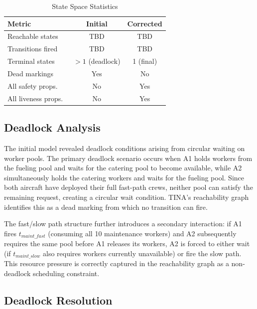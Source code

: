 \documentclass[conference]{IEEEtran}
\begin{document}
\begin{table}[htbp]
  \caption{State Space Statistics}
  \label{tab:statespace}
  \small
  \begin{tabularx}{\columnwidth}{@{}Xcc@{}}
    \toprule
    \textbf{Metric} & \textbf{Initial} & \textbf{Corrected} \\
    \midrule
    Reachable states     & TBD            & TBD           \\
    Transitions fired    & TBD            & TBD           \\
    Terminal states      & $>1$ (deadlock) & 1 (final)    \\
    Dead markings        & Yes            & No            \\
    All safety props.\   & No             & Yes           \\
    All liveness props.\ & No             & Yes           \\
    \bottomrule
  \end{tabularx}
\end{table}

\subsection{Deadlock Analysis}

The initial model revealed deadlock conditions arising from circular waiting on
worker pools. The primary deadlock scenario occurs when A1 holds workers from the
fueling pool and waits for the catering pool to become available, while A2
simultaneously holds the catering workers and waits for the fueling pool. Since
both aircraft have deployed their full fast-path crews, neither pool can satisfy
the remaining request, creating a circular wait condition. TINA's reachability
graph identifies this as a dead marking from which no transition can fire.

The fast/slow path structure further introduces a secondary interaction: if A1
fires $t_{\mathit{maint\_fast}}$ (consuming all 10 maintenance workers) and A2
subsequently requires the same pool before A1 releases its workers, A2 is forced
to either wait (if $t_{\mathit{maint\_slow}}$ also requires workers currently
unavailable) or fire the slow path. This resource pressure is correctly captured
in the reachability graph as a non-deadlock scheduling constraint.

\subsection{Deadlock Resolution}
\end{document}
